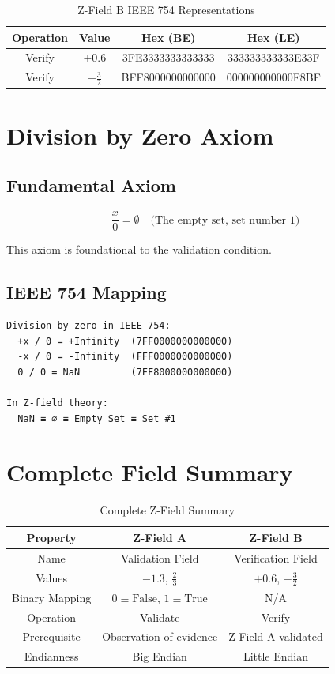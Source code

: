 \documentclass[12pt]{article}
\begin{document}
\begin{table}[h]
\centering
\begin{tabular}{|c|c|c|c|}
\hline
\textbf{Operation} & \textbf{Value} & \textbf{Hex (BE)} & \textbf{Hex (LE)} \\
\hline
Verify & $+0.6$ & 3FE3333333333333 & 333333333333E33F \\
\hline
Verify & $-\frac{3}{2}$ & BFF8000000000000 & 000000000000F8BF \\
\hline
\end{tabular}
\caption{Z-Field B IEEE 754 Representations}
\end{table}

\section{Division by Zero Axiom}

\subsection{Fundamental Axiom}

\begin{equation}
\boxed{\frac{x}{0} = \emptyset \quad \text{(The empty set, set number 1)}}
\end{equation}

This axiom is foundational to the validation condition.

\subsection{IEEE 754 Mapping}

\begin{verbatim}
Division by zero in IEEE 754:
  +x / 0 = +Infinity  (7FF0000000000000)
  -x / 0 = -Infinity  (FFF0000000000000)
  0 / 0 = NaN         (7FF8000000000000)

In Z-field theory:
  NaN ≡ ∅ ≡ Empty Set ≡ Set #1
\end{verbatim}

\section{Complete Field Summary}

\begin{table}[h]
\centering
\begin{tabular}{|c|c|c|}
\hline
\textbf{Property} & \textbf{Z-Field A} & \textbf{Z-Field B} \\
\hline
Name & Validation Field & Verification Field \\
\hline
Values & $-1.3$, $\frac{2}{3}$ & $+0.6$, $-\frac{3}{2}$ \\
\hline
Binary Mapping & $0 \equiv \text{False}$, $1 \equiv \text{True}$ & N/A \\
\hline
Operation & Validate & Verify \\
\hline
Prerequisite & Observation of evidence & Z-Field A validated \\
\hline
Endianness & Big Endian & Little Endian \\
\hline
\end{tabular}
\caption{Complete Z-Field Summary}
\end{table}
\end{document}
